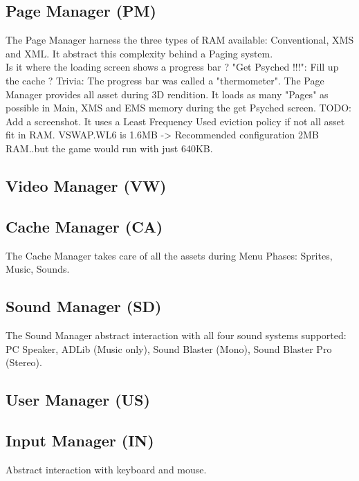 \documentclass[book.tex]{subfiles}
\begin{document}
\subsection{Page Manager (PM)}

The Page Manager harness the three types of RAM available: Conventional, XMS and XML. It abstract this complexity behind a Paging system.\\
Is it where the loading screen shows a progress bar ?
"Get Psyched !!!": Fill up the cache ?
Trivia: The progress bar was called a "thermometer".
The Page Manager provides all asset during 3D rendition. 
It loads as many "Pages" as possible in Main, XMS and EMS memory during the get Psyched screen.
TODO: Add a screenshot.
It uses a Least Frequency Used eviction policy if not all asset fit in RAM. VSWAP.WL6 is 1.6MB -> Recommended configuration 2MB RAM..but the game would run with just 640KB.
\subsection{Video Manager (VW)}


\subsection{Cache Manager (CA)}
The Cache Manager takes care of all the assets during Menu Phases: Sprites, Music, Sounds.
\subsection{Sound Manager (SD)}
The Sound Manager abstract interaction with all four sound systems supported: PC Speaker, ADLib (Music only), Sound Blaster (Mono), Sound Blaster Pro (Stereo).
\subsection{User Manager (US)}


\subsection{Input Manager (IN)}
Abstract interaction with keyboard and mouse.
\end{document}
